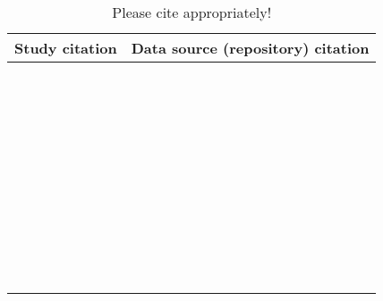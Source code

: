 \begin{table}[!tbp]
\caption{Please cite appropriately! \label{tab}} 
\begin{center}
\begin{tabular}{ll}
\hline\hline
\multicolumn{1}{c}{Study citation}&\multicolumn{1}{c}{Data source (repository) citation}\tabularnewline
\hline
\citet{Chan:2017aa}&\citet{Chan:2017aa}\tabularnewline
\citet{Chant:1966aa}&\citet{Novak:2020aa}\tabularnewline
\citet{Chong:2006aa}&\citet{Chong:2020aa}\tabularnewline
\citet{Colton:1983aa, Colton:1987aa}&\citet{Novak:2020aa}\tabularnewline
\citet{Crowley:1989aa}&\citet{Novak:2020aa}\tabularnewline
\citet{Edwards:1961aa}&\citet{Novak:2020aa}\tabularnewline
\citet{Elliott:2005aa}&\citet{Elliott:2020aa}\tabularnewline
\citet{Elliott:2006aa}&\citet{Elliott:2020ab}\tabularnewline
\citet{Eveleigh:1982aa}&\citet{Novak:2020aa}\tabularnewline
\citet{Fussmann:2005aa}&\citet{Fussmann:2020aa}\tabularnewline
\citet{Griffen:2007aa}&\citet{Novak:2020aa}\tabularnewline
\citet{Hassan:1976aa}&\citet{Novak:2020aa}\tabularnewline
\citet{Hossie:2016aa}&\citet{Hossie:2020aa}\tabularnewline
\citet{Huffaker:1982aa}&\citet{Novak:2020aa}\tabularnewline
\citet{Iyer:1996aa}&\citet{Novak:2020aa}\tabularnewline
\citet{Johnson:2006aa}&\citet{Novak:2020aa}\tabularnewline
\citet{Jones:1988aa, Jones:1986aa}&\citet{Novak:2020aa}\tabularnewline
\citet{Katz:1985ai}&\citet{Arditi:1990sp}\tabularnewline
\citet{Kfir:1983aa}&\citet{Novak:2020aa}\tabularnewline
\citet{Kratina:2009aa}&\citet{Kratina:2020aa}\tabularnewline
\citet{Krylov:1992aa}&\citet{Novak:2020aa}\tabularnewline
\citet{Kumar:1985aa}&\citet{Novak:2020aa}\tabularnewline
\citet{Lang:2012aa}&\citet{Lang:2020aa}\tabularnewline
\citet{Lester:2002aa}&\citet{Lester:2020aa}\tabularnewline
\citet{Long:2012aa}&\citet{Long:2020aa}\tabularnewline
\citet{Long:2012ab}&\citet{Long:2020ab}\tabularnewline
\citet{Mansour:1991aa}&\citet{Novak:2020aa}\tabularnewline
\citet{Mattila:1998aa}&\citet{Novak:2020aa}\tabularnewline
\citet{Medoc:2013aa}&\citet{Medoc:2020aa}\tabularnewline
\citet{Medoc:2015aa}&\citet{Medoc:2020ab}\tabularnewline
\citet{Mertz:1968aa}&\citet{Novak:2020aa}\tabularnewline
\citet{Mills:2004aa}&\citet{Novak:2020aa}\tabularnewline
\citet{Montoya:2000aa}&\citet{Novak:2020aa}\tabularnewline
\citet{Prokopenko:2017aa}&\citet{Prokopenko:2020aa}\tabularnewline
\citet{Ranta:1985aa}&\citet{Novak:2020aa}\tabularnewline
\citet{Reeve:1997aa}&\citet{Reeve:2020aa}\tabularnewline
\citet{Salt:1974aa}&\citet{Novak:2020aa}\tabularnewline
\citet{Uttley:1980aa}&\citet{Novak:2020aa}\tabularnewline
\citet{Vahl:2005aa}&\citet{Novak:2020aa}\tabularnewline
\citet{Von-Westernhagen:1976aa}&\citet{Novak:2020aa}\tabularnewline
\citet{Vucetich:2002aa}&\citet{Vucetich:2002aa, Jost:2005aa}\tabularnewline
\citet{Walde:1984aa}&\citet{Novak:2020aa}\tabularnewline
\citet{Wong:2005aa}&\citet{Wong:2020ab}\tabularnewline
\hline
\end{tabular}\end{center}
\end{table}
